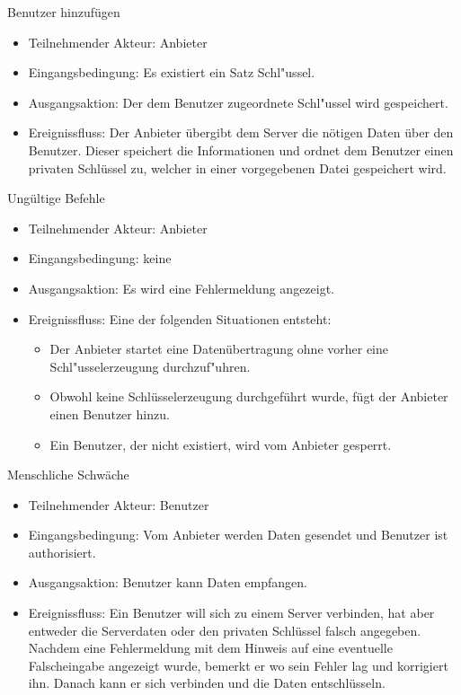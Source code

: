 \documentclass[a4paper,10pt]{scrartcl}
\begin{document}
\begin{usecase}

 {Benutzer hinzufügen
   \begin{itemize}
   \item Teilnehmender Akteur: Anbieter
   \item Eingangsbedingung: Es existiert ein Satz Schl"ussel.
   \item Ausgangsaktion: Der dem Benutzer zugeordnete Schl"ussel wird gespeichert.
   \item Ereignissfluss: Der Anbieter übergibt dem Server die nötigen Daten über den Benutzer.
         Dieser speichert die Informationen und ordnet dem Benutzer einen privaten Schlüssel
         zu, welcher in einer vorgegebenen Datei gespeichert wird.
   \end{itemize}
}

 {Ungültige Befehle
   \begin{itemize}
   \item Teilnehmender Akteur: Anbieter
   \item Eingangsbedingung: keine
   \item Ausgangsaktion: Es wird eine Fehlermeldung angezeigt.
   \item Ereignissfluss:
          Eine der folgenden Situationen entsteht:
          \begin{itemize}
           \item Der Anbieter startet eine Datenübertragung ohne vorher eine Schl"usselerzeugung
                 durchzuf"uhren.
           \item Obwohl keine Schlüsselerzeugung durchgeführt wurde, fügt der Anbieter einen Benutzer hinzu.
           \item Ein Benutzer, der nicht existiert, wird vom Anbieter gesperrt.
           \end{itemize}
   \end{itemize}
}
 {Menschliche Schwäche
   \begin{itemize}
   \item Teilnehmender Akteur: Benutzer
   \item Eingangsbedingung: Vom Anbieter werden Daten gesendet und Benutzer ist authorisiert.
   \item Ausgangsaktion: Benutzer kann Daten empfangen.
   \item Ereignissfluss: Ein Benutzer will sich zu einem Server verbinden, hat aber entweder
             die Serverdaten oder den privaten Schlüssel falsch angegeben. Nachdem eine
             Fehlermeldung mit dem Hinweis auf eine eventuelle Falscheingabe angezeigt wurde,
             bemerkt er wo sein Fehler lag und korrigiert ihn. Danach kann er sich verbinden
             und die Daten entschlüsseln.
   \end{itemize}
}
\end{usecase}
\end{document}
